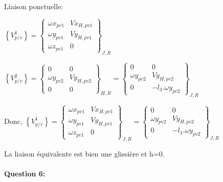 Liaison ponctuelle:

$\left\{V^1_{p/v}\right\}=\left\{
\begin{matrix}
 \omega x_{pv1} & Vx_{H,pv1} \\
 \omega y_{pv1} & Vy_{H,pv1} \\
 \omega z_{pv1} & 0 
\end{matrix}
\right \}_{J,R}$

$\left\{V^2_{p/v}\right\}=\left\{
\begin{matrix}
 0 & 0 \\
 \omega y_{pv2} & Vy_{H,pv2} \\
 0 & 0 
\end{matrix}
\right \}_{H,R}=\left\{
\begin{matrix}
 0 & 0 \\
 \omega y_{pv2} & Vy_{H,pv2} \\
 0 & -l_3.\omega y_{pv2}
\end{matrix}
\right \}_{J,R}$

Donc, 
$\left\{V^1_{p/v}\right\}=\left\{
\begin{matrix}
 \omega x_{pv1} & Vx_{H,pv1} \\
 \omega y_{pv1} & Vy_{H,pv1} \\
 \omega z_{pv1} & 0 
\end{matrix}
\right \}_{J,R}=\left\{
\begin{matrix}
 0 & 0 \\
 \omega y_{pv2} & Vy_{H,pv2} \\
 0 & -l_3.\omega y_{pv2}
\end{matrix}
\right \}_{J,R}$

La liaison équivalente est bien une glissière et h=0.

\newpage

\paragraph{Question 6:}

